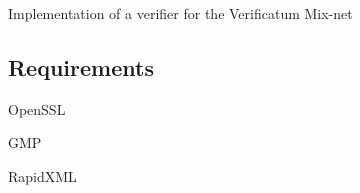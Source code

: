 Implementation of a verifier for the Verificatum Mix-\/net

\subsection*{Requirements}


\begin{DoxyItemize}
\item Open\-S\-S\-L
\item G\-M\-P
\item Rapid\-X\-M\-L 
\end{DoxyItemize}